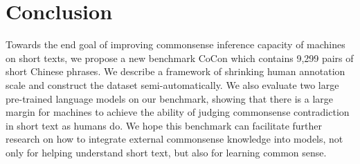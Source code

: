 \section{Conclusion}
Towards the end goal of improving commonsense inference capacity of machines on short texts, 
we propose a new benchmark CoCon which contains 9,299 pairs of short Chinese phrases. 
We describe a framework of shrinking human annotation scale and construct the dataset semi-automatically.
We also evaluate two large pre-trained language models on our benchmark, 
showing that there is a large margin for machines to achieve the ability of judging commonsense contradiction in short text as humans do. 
We hope this benchmark can facilitate further research on how to integrate external commonsense knowledge into models, not only for helping understand short text, but also for learning common sense.